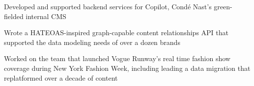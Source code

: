 \begin{job}

  \begin{accomplishments}
    \item Developed and supported backend services for Copilot, Cond\'{e} Nast's
    green-fielded internal CMS
    \item Wrote a HATEOAS-inspired graph-capable content relationships API that
    supported the data modeling needs of over a dozen brands
    \item Worked on the team that launched Vogue Runway's real time fashion show
    coverage during New York Fashion Week, including leading a data migration
    that replatformed over a decade of content
  \end{accomplishments}
\end{job}
